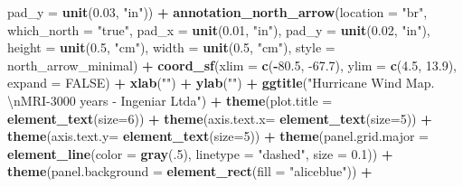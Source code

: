 \documentclass[12pt,oneside]{reedthesis}
\newenvironment{Shaded}{\begin{snugshade}}{\end{snugshade}}
\newcommand{\CharTok}[1]{\textcolor[rgb]{0.31,0.60,0.02}{#1}}
\newcommand{\DataTypeTok}[1]{\textcolor[rgb]{0.13,0.29,0.53}{#1}}
\newcommand{\DecValTok}[1]{\textcolor[rgb]{0.00,0.00,0.81}{#1}}
\newcommand{\FloatTok}[1]{\textcolor[rgb]{0.00,0.00,0.81}{#1}}
\newcommand{\KeywordTok}[1]{\textcolor[rgb]{0.13,0.29,0.53}{\textbf{#1}}}
\newcommand{\NormalTok}[1]{#1}
\newcommand{\OperatorTok}[1]{\textcolor[rgb]{0.81,0.36,0.00}{\textbf{#1}}}
\newcommand{\OtherTok}[1]{\textcolor[rgb]{0.56,0.35,0.01}{#1}}
\newcommand{\StringTok}[1]{\textcolor[rgb]{0.31,0.60,0.02}{#1}}
\begin{document}
\begin{Shaded}
\begin{Highlighting}[]
   \DataTypeTok{pad_y =} \KeywordTok{unit}\NormalTok{(}\FloatTok{0.03}\NormalTok{, }\StringTok{"in"}\NormalTok{)) }\OperatorTok{+}\StringTok{ }
\StringTok{  }\KeywordTok{annotation_north_arrow}\NormalTok{(}\DataTypeTok{location =} \StringTok{"br"}\NormalTok{, }\DataTypeTok{which_north =} \StringTok{"true"}\NormalTok{, }\DataTypeTok{pad_x =} \KeywordTok{unit}\NormalTok{(}\FloatTok{0.01}\NormalTok{, }\StringTok{"in"}\NormalTok{), }\DataTypeTok{pad_y =} \KeywordTok{unit}\NormalTok{(}\FloatTok{0.02}\NormalTok{, }\StringTok{"in"}\NormalTok{), }\DataTypeTok{height =} \KeywordTok{unit}\NormalTok{(}\FloatTok{0.5}\NormalTok{, }\StringTok{"cm"}\NormalTok{), }
   \DataTypeTok{width =} \KeywordTok{unit}\NormalTok{(}\FloatTok{0.5}\NormalTok{, }\StringTok{"cm"}\NormalTok{), }\DataTypeTok{style =}\NormalTok{ north_arrow_minimal) }\OperatorTok{+}
\StringTok{  }\KeywordTok{coord_sf}\NormalTok{(}\DataTypeTok{xlim =} \KeywordTok{c}\NormalTok{(}\OperatorTok{-}\FloatTok{80.5}\NormalTok{, }\FloatTok{-67.7}\NormalTok{), }\DataTypeTok{ylim =} \KeywordTok{c}\NormalTok{(}\FloatTok{4.5}\NormalTok{, }\FloatTok{13.9}\NormalTok{), }\DataTypeTok{expand =} \OtherTok{FALSE}\NormalTok{) }\OperatorTok{+}
\StringTok{  }\KeywordTok{xlab}\NormalTok{(}\StringTok{""}\NormalTok{) }\OperatorTok{+}\StringTok{ }
\StringTok{  }\KeywordTok{ylab}\NormalTok{(}\StringTok{""}\NormalTok{) }\OperatorTok{+}\StringTok{ }
\StringTok{  }\KeywordTok{ggtitle}\NormalTok{(}\StringTok{"Hurricane Wind Map. }\CharTok{\textbackslash{}n}\StringTok{MRI-3000 years - Ingeniar Ltda"}\NormalTok{) }\OperatorTok{+}\StringTok{ }
\StringTok{  }\KeywordTok{theme}\NormalTok{(}\DataTypeTok{plot.title =} \KeywordTok{element_text}\NormalTok{(}\DataTypeTok{size=}\DecValTok{6}\NormalTok{)) }\OperatorTok{+}
\StringTok{  }\KeywordTok{theme}\NormalTok{(}\DataTypeTok{axis.text.x=} \KeywordTok{element_text}\NormalTok{(}\DataTypeTok{size=}\DecValTok{5}\NormalTok{)) }\OperatorTok{+}\StringTok{ }
\StringTok{  }\KeywordTok{theme}\NormalTok{(}\DataTypeTok{axis.text.y=} \KeywordTok{element_text}\NormalTok{(}\DataTypeTok{size=}\DecValTok{5}\NormalTok{)) }\OperatorTok{+}
\StringTok{  }\KeywordTok{theme}\NormalTok{(}\DataTypeTok{panel.grid.major =} \KeywordTok{element_line}\NormalTok{(}\DataTypeTok{color =} \KeywordTok{gray}\NormalTok{(.}\DecValTok{5}\NormalTok{), }\DataTypeTok{linetype =} \StringTok{"dashed"}\NormalTok{, }\DataTypeTok{size =} \FloatTok{0.1}\NormalTok{)) }\OperatorTok{+}
\StringTok{  }\KeywordTok{theme}\NormalTok{(}\DataTypeTok{panel.background =} \KeywordTok{element_rect}\NormalTok{(}\DataTypeTok{fill =} \StringTok{"aliceblue"}\NormalTok{)) }\OperatorTok{+}

\end{Highlighting}
\end{Shaded}
\end{document}

